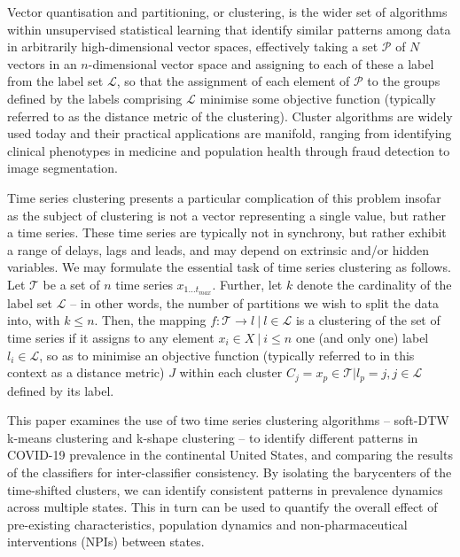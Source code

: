 \documentclass{article}
\begin{document}
Vector quantisation and partitioning, or clustering, is the wider set of algorithms within unsupervised statistical learning that identify similar patterns among data in arbitrarily high-dimensional vector spaces, effectively taking a set $\mathcal{P}$ of $N$ vectors in an $n$-dimensional vector space and assigning to each of these a label from the label set $\mathcal{L}$, so that the assignment of each element of $\mathcal{P}$ to the groups defined by the labels comprising $\mathcal{L}$ minimise some objective function (typically referred to as the distance metric of the clustering). Cluster algorithms are widely used today and their practical applications are manifold, ranging from identifying clinical phenotypes in  medicine and population health\cite{ahmad2014clinical,haldar2008cluster,lochner2005cluster,weatherall2009distinct,ye2014different} through fraud detection\cite{behera2015credit,liu2013healthcare,peng2006application,sabau2012survey,subudhi2017use} to image segmentation.\cite{chuang2006fuzzy,coleman1979image,jin2018accelerating,lafata2018data,pappas1989adaptive,wu1993optimal}

Time series clustering presents a particular complication of this problem insofar as the subject of clustering is not a vector representing a single value, but rather a time series. These time series are typically not in synchrony, but rather exhibit a range of delays, lags and leads, and may depend on extrinsic and/or hidden variables. We may formulate the essential task of time series clustering as follows. Let $\mathcal{T}$ be a set of $n$ time series $x_{1 \ldots t_{max}}$. Further, let $k$ denote the cardinality of the label set $\mathcal{L}$ -- in other words, the number of partitions we wish to split the data into, with $k \leq n$. Then, the mapping $f: \mathcal{T} \rightarrow l \ | \ l \in \mathcal{L}$ is a clustering of the set of time series if it assigns to any element $x_i \in X \ | \ i \leq n$ one (and only one) label $l_i \in \mathcal{L}$, so as to minimise an objective function (typically referred to in this context as a distance metric) $J$ within each cluster $C_j = {x_p \in \mathcal{T} | l_p = j, j \in \mathcal{L}}$ defined by its label.

This paper examines the use of two time series clustering algorithms -- soft-DTW k-means clustering and k-shape clustering -- to identify different patterns in COVID-19 prevalence in the continental United States, and comparing the results of the classifiers for inter-classifier consistency. By isolating the barycenters of the time-shifted clusters, we can identify consistent patterns in prevalence dynamics across multiple states. This in turn can be used to quantify the overall effect of pre-existing characteristics, population dynamics and non-pharmaceutical interventions (NPIs) between states.
\end{document}
